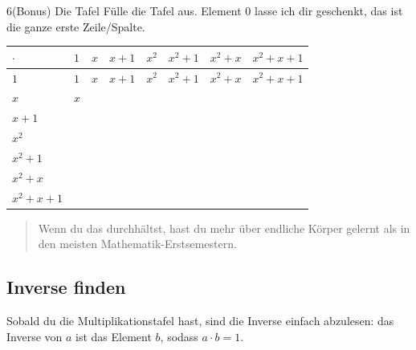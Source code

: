\begin{bleistiftuebung}{6}{(Bonus) Die Tafel}
Fülle die Tafel aus. Element 0 lasse ich dir geschenkt, das ist die
ganze erste Zeile/Spalte.

\begin{center}\small
\begin{tabular}{l|lllllll}
  \toprule
  $\cdot$  & $1$ & $x$ & $x{+}1$ & $x^2$ & $x^2{+}1$ & $x^2{+}x$ & $x^2{+}x{+}1$ \\
  \midrule
  $1$            & $1$ & $x$ & $x{+}1$ & $x^2$ & $x^2{+}1$ & $x^2{+}x$ & $x^2{+}x{+}1$ \\
  $x$            & $x$ &     &         &       &           &           &               \\
  $x{+}1$        &     &     &         &       &           &           &               \\
  $x^2$          &     &     &         &       &           &           &               \\
  $x^2{+}1$      &     &     &         &       &           &           &               \\
  $x^2{+}x$      &     &     &         &       &           &           &               \\
  $x^2{+}x{+}1$  &     &     &         &       &           &           &               \\
  \bottomrule
\end{tabular}
\end{center}

\begin{quote}
Wenn du das durchhältst, hast du mehr über endliche Körper gelernt
als in den meisten Mathematik-Erstsemestern.
\end{quote}
\end{bleistiftuebung}

\subsection*{Inverse finden}

Sobald du die Multiplikationstafel hast, sind die Inverse einfach
abzulesen: das Inverse von $a$ ist das Element $b$, sodass
$a \cdot b = 1$.

